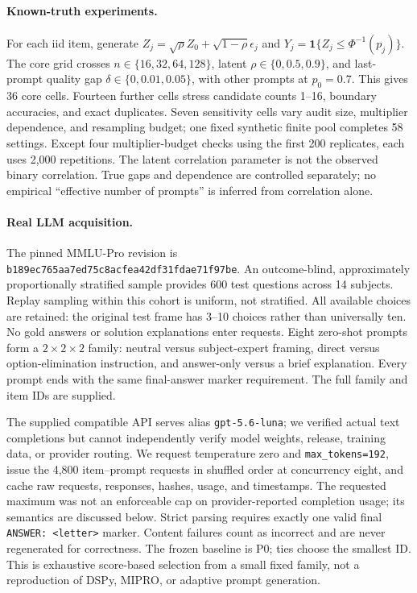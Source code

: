 \documentclass{article}
\newcommand{\ind}{\mathbf 1}
\begin{document}
\paragraph{Known-truth experiments.}
For each iid item, generate $Z_j=\sqrt{\rho}Z_0+\sqrt{1-\rho}\epsilon_j$ and $Y_j=\ind\{Z_j\leq\Phi^{-1}(p_j)\}$. The core grid crosses $n\in\{16,32,64,128\}$, latent $\rho\in\{0,0.5,0.9\}$, and last-prompt quality gap $\delta\in\{0,0.01,0.05\}$, with other prompts at $p_0=0.7$. This gives 36 core cells. Fourteen further cells stress candidate counts 1--16, boundary accuracies, and exact duplicates. Seven sensitivity cells vary audit size, multiplier dependence, and resampling budget; one fixed synthetic finite pool completes 58 settings. Except four multiplier-budget checks using the first 200 replicates, each uses 2,000 repetitions. The latent correlation parameter is not the observed binary correlation. True gaps and dependence are controlled separately; no empirical ``effective number of prompts'' is inferred from correlation alone.

\paragraph{Real LLM acquisition.}
The pinned MMLU-Pro revision is \texttt{b189ec765aa7ed75c8acfea42df31fdae71f97be}. An outcome-blind, approximately proportionally stratified sample provides 600 test questions across 14 subjects. Replay sampling within this cohort is uniform, not stratified. All available choices are retained: the original test frame has 3--10 choices rather than universally ten. No gold answers or solution explanations enter requests. Eight zero-shot prompts form a $2\times2\times2$ family: neutral versus subject-expert framing, direct versus option-elimination instruction, and answer-only versus a brief explanation. Every prompt ends with the same final-answer marker requirement. The full family and item IDs are supplied.

The supplied compatible API serves alias \texttt{gpt-5.6-luna}; we verified actual text completions but cannot independently verify model weights, release, training data, or provider routing. We request temperature zero and \texttt{max\_tokens=192}, issue the 4,800 item--prompt requests in shuffled order at concurrency eight, and cache raw requests, responses, hashes, usage, and timestamps. The requested maximum was not an enforceable cap on provider-reported completion usage; its semantics are discussed below. Strict parsing requires exactly one valid final \texttt{ANSWER: <letter>} marker. Content failures count as incorrect and are never regenerated for correctness. The frozen baseline is P0; ties choose the smallest ID. This is exhaustive score-based selection from a small fixed family, not a reproduction of DSPy, MIPRO, or adaptive prompt generation.
\end{document}
